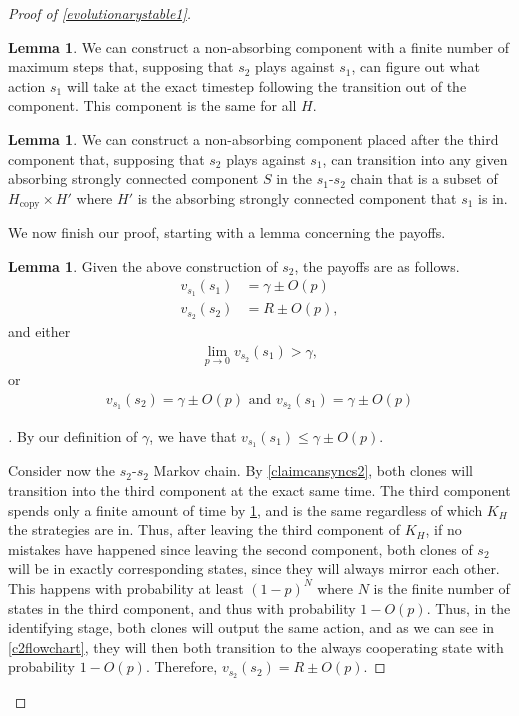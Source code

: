 \documentclass[11pt]{amsart}
\theoremstyle{definition}
\newtheorem{lemma}[theorem]{Lemma}
\theoremstyle{remark}
\newenvironment{subproof}[1][\proofname]{%
  \renewcommand{\qedsymbol}{$\blacksquare$}%
  \begin{proof}[#1]%
}{%
  \end{proof}%
}
\begin{document}
\begin{proof}[Proof of \cref{evolutionarystable1}]
      \begin{lemma}
        \label{claimcanfigureout}
        We can construct a non-absorbing component with a finite number of maximum steps that, supposing that $s_2$ plays against $s_1$, can figure out what action $s_1$ will take at the exact timestep following the transition out of the component. This component is the same for all $H$.
      \end{lemma}

      \begin{lemma}
        \label{claimcanforcegoodstate}
        We can construct a non-absorbing component placed after the third component that, supposing that $s_2$ plays against $s_1$, can transition into any given absorbing strongly connected component $S$ in the $s_1$-$s_2$ chain that is a subset of $H_\text{copy} \times H'$ where $H'$ is the absorbing strongly connected component that $s_1$ is in.
      \end{lemma}

      We now finish our proof, starting with a lemma concerning the payoffs.

      \begin{lemma}
        \label{claimpayoffs}
        Given the above construction of $s_2$, the payoffs are as follows.
      \begin{align*}
        v_{s_1}(s_1) &= \gamma \pm O(p) \\
        v_{s_2}(s_2) &= R \pm O(p),
      \end{align*}
      and either
      \begin{align*}
        \lim_{p \to 0} v_{s_2}(s_1) > \gamma,
      \end{align*}
      or
      \begin{align*}
        v_{s_1}(s_2) = \gamma \pm O(p) \text{ and }
        v_{s_2}(s_1) = \gamma \pm O(p)
      \end{align*}
      \end{lemma}
      \begin{subproof}
        By our definition of $\gamma$, we have that $v_{s_1}(s_1) \leq \gamma \pm O(p)$.

        Consider now the $s_2$-$s_2$ Markov chain. By \cref{claimcansyncs2}, both clones will transition into the third component at the exact same time. The third component spends only a finite amount of time by \cref{claimcanfigureout}, and is the same regardless of which $K_H$ the strategies are in. Thus, after leaving the third component of $K_H$, if no mistakes have happened since leaving the second component, both clones of $s_2$ will be in exactly corresponding states, since they will always mirror each other. This happens with probability at least $(1-p)^N$ where $N$ is the finite number of states in the third component, and thus with probability $1 - O(p)$. Thus, in the identifying stage, both clones will output the same action, and as we can see in \cref{c2flowchart}, they will then both transition to the always cooperating state with probability $1 - O(p)$. Therefore, $v_{s_2}(s_2) = R \pm O(p)$.


\end{subproof}
\end{proof}
\end{document}
